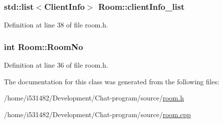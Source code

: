 \subsubsection[{\texorpdfstring{client\+Info\+\_\+list}{clientInfo_list}}]{\setlength{\rightskip}{0pt plus 5cm}std\+::list$<${\bf Client\+Info}$>$ Room\+::client\+Info\+\_\+list\hspace{0.3cm}{\ttfamily [protected]}}\hypertarget{class_room_a53f31ccc34c3777273a021ed5f56e846}{}\label{class_room_a53f31ccc34c3777273a021ed5f56e846}


Definition at line 38 of file room.\+h.

\subsubsection[{\texorpdfstring{Room\+No}{RoomNo}}]{\setlength{\rightskip}{0pt plus 5cm}int Room\+::\+Room\+No\hspace{0.3cm}{\ttfamily [protected]}}\hypertarget{class_room_a7b2baed8e22a938246e54984cf396b47}{}\label{class_room_a7b2baed8e22a938246e54984cf396b47}


Definition at line 36 of file room.\+h.



The documentation for this class was generated from the following files\+:\begin{DoxyCompactItemize}
\item 
/home/i531482/\+Development/\+Chat-\/program/source/\hyperlink{room_8h}{room.\+h}\item 
/home/i531482/\+Development/\+Chat-\/program/source/\hyperlink{room_8cpp}{room.\+cpp}\end{DoxyCompactItemize}
